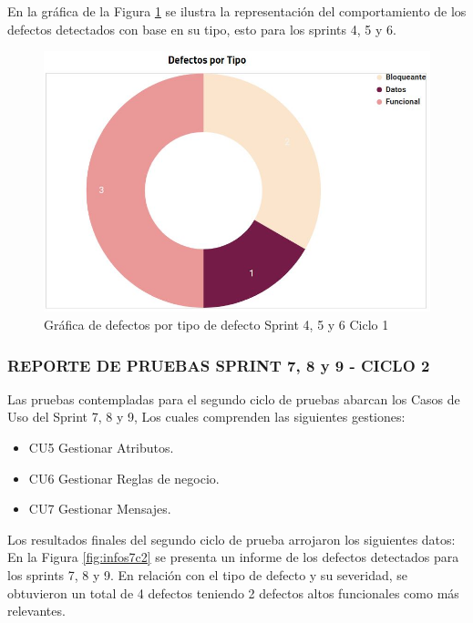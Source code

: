 En la gráfica de la Figura \ref{fig:infos4c2-2} se ilustra la representación del comportamiento de los defectos detectados con base en su tipo, esto para los sprints 4, 5 y 6.

\begin{figure}[H]
	\begin{center}
		\includegraphics[width=.65\textwidth]{images/pruebas/s4c2-2}
		\caption{Gráfica de defectos por tipo de defecto Sprint 4, 5 y 6  Ciclo 1}
		\label{fig:infos4c2-2}
	\end{center}
\end{figure}

\subsubsection{REPORTE DE PRUEBAS SPRINT 7, 8 y 9 - CICLO 2}

Las pruebas contempladas para el segundo ciclo de pruebas abarcan los Casos de Uso del Sprint 7, 8 y 9, Los cuales comprenden las siguientes gestiones:

\begin{itemize}
	\item CU5 Gestionar Atributos.
	\item CU6 Gestionar Reglas de negocio.
	\item CU7 Gestionar Mensajes.
\end{itemize}

Los resultados finales del segundo ciclo de prueba arrojaron los siguientes datos:\\

En la Figura \ref{fig:infos7c2} se presenta un informe de los defectos detectados para los sprints 7, 8 y 9. En relación con el tipo de defecto y su severidad, se obtuvieron un total de 4 defectos teniendo 2 defectos altos funcionales como más relevantes.

